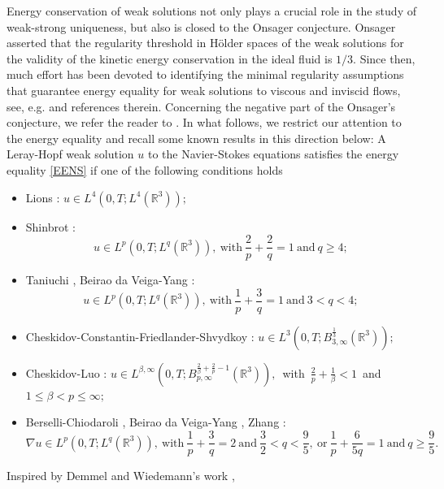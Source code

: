 \documentclass[11pt]{article}
\theoremstyle{plain}\newtheorem{definition}{Definition}[section]
\theoremstyle{definition}\newtheorem{theorem}{Theorem}[section]
\theoremstyle{plain}\newtheorem{lemma}[theorem]{Lemma}
\theoremstyle{plain}\newtheorem{coro}[theorem]{Corollary}
\theoremstyle{plain}\newtheorem{prop}[theorem]{Proposition}
\theoremstyle{remark}\newtheorem{remark}{Remark}[section]
\newcommand{\be}{\begin{equation}}
\newcommand{\ee}{\end{equation}}
\newcommand{\f}{\frac}
\numberwithin{equation}{section}
\begin{document}
Energy conservation  of
weak solutions not only plays a crucial role in the study of weak-strong uniqueness, but also  is closed to the Onsager conjecture.    Onsager \cite{[Onsager]} asserted that
the
 regularity threshold in H\"older spaces of the  weak solutions  for the validity of the  kinetic energy  conservation in the ideal fluid is $1/3$. Since then, much effort has been devoted to identifying the minimal regularity assumptions that guarantee energy equality for weak solutions to viscous and inviscid flows, see, e.g. \cite{[Lions],[Shinbrot],[BY],[BY2],[Berselli2],[CCFS],[LS],[CL],[BC],[Zhang],[Galdi],[BCS],[BG],[BKR],[FGSW],[FW2018]} and references therein. Concerning the negative part of the Onsager's conjecture, we refer the reader to \cite{[GKN],[Isett],[JTW],[DS0],[DS1]}. In what follows, we restrict our attention to the energy equality and  recall some known  results in this direction below:
A Leray-Hopf weak solution $u$ to the Navier-Stokes equations satisfies the energy equality \eqref{EENS} if one of the following conditions holds
\begin{itemize}
\item Lions \cite{[Lions]}: $u\in L^{4}(0,T;L^{4}(\mathbb{R}^{3}));$

\item Shinbrot \cite{[Shinbrot]}:
\be\label{Shinb}
u\in L^{p}(0,T;L^{q}(\mathbb{R}^{3})),~\text{with}~\f{2}{p}+
 \f{2}{q}=1~\text{and}~q\geq 4;\ee
\item Taniuchi \cite{[Taniuchi]}, Beirao da Veiga-Yang \cite{[BY]}:
\be\label{tby}
u\in L^{p}(0,T;L^{q}(\mathbb{R}^{3})),~\text{with}~  \f{1}{p}+
 \f{3}{q}=1 ~\text{and}~ 3<q< 4;\ee
\item  Cheskidov-Constantin-Friedlander-Shvydkoy \cite{[CCFS]}: $u\in L^{3}(0,T;B^{\f13}_{3,\infty}(\mathbb{R}^{3}));$
\item Cheskidov-Luo \cite{[CL]}:   $u\in L^{\beta,\infty}(0,T;B^{\f2\beta+\f2p-1}_{p,\infty}(\mathbb{R}^{3})),$~with~$\f2p+\f1\beta<1$~and~$1\leq\beta<p\leq\infty;$
 \item Berselli-Chiodaroli  \cite{[BC]}, Beirao da Veiga-Yang \cite{[BY2]}, Zhang \cite{[Zhang]}:
\be\label{bcz}
\nabla u \in L^{p}\left(0, T ; L^{q}\left(\mathbb{R}^{3}\right)\right),~\text{with}~
\frac{1}{p}+\frac{3 }{q}=2~\text{and}~\frac{3 }{2}<q<\frac{9}{5},~\text{or}~
\frac{1}{p}+\frac{6}{5 q}=1~\text{and}~ q\geq\frac{9}{5}.\ee
   \end{itemize}
Inspired by  Demmel and   Wiedemann's work \cite{[DW]}, 
\end{document}
